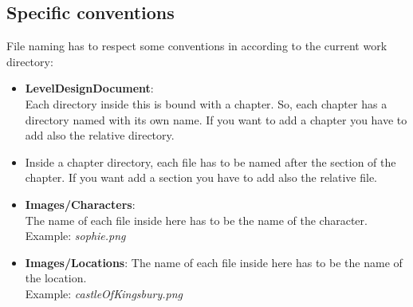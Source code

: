 \documentclass[12pt]{article}
\begin{document}
\subsection{Specific conventions}
File naming has to respect some conventions in according to the current work directory:
\begin{itemize}
  \item \textbf{LevelDesignDocument}:\\
  Each directory inside this is bound with a chapter. So, each chapter has a directory named with its own name. If you want to add a chapter you have to add also the relative directory.
  \item Inside a chapter directory, each file has to be named after the section of the chapter. If you want add a section you have to add also the relative file.
  
  \item \textbf{Images/Characters}:\\
  The name of each file inside here has to be the name of the character.\\
  Example: \textit{sophie.png}

  \item \textbf{Images/Locations}:
  The name of each file inside here has to be the name of the location.\\
  Example: \textit{castleOfKingsbury.png}


\end{itemize}
\end{document}
